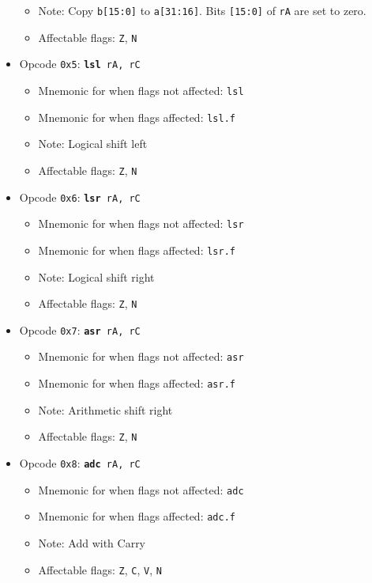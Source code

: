 \documentclass{article}
\begin{document}
\begin{itemize}
\begin{itemize}
			\item Note:  Copy \texttt{b[15:0]} to \texttt{a[31:16]}.
			Bits \texttt{[15:0]} of \texttt{rA} are set to zero.
			\item Affectable flags:
				\texttt{Z}, \texttt{N}
		\end{itemize}
		\item Opcode \texttt{0x5}:
			\texttt{\textbf{lsl} rA, rC}
		\begin{itemize}
			\item Mnemonic for when flags not affected:  \texttt{lsl}
			\item Mnemonic for when flags affected:  \texttt{lsl.f}
			\item Note:  Logical shift left
			\item Affectable flags:
				\texttt{Z}, \texttt{N}
		\end{itemize}
		\item Opcode \texttt{0x6}:
			\texttt{\textbf{lsr} rA, rC}
		\begin{itemize}
			\item Mnemonic for when flags not affected:  \texttt{lsr}
			\item Mnemonic for when flags affected:  \texttt{lsr.f}
			\item Note:  Logical shift right
			\item Affectable flags:
				\texttt{Z}, \texttt{N}
		\end{itemize}
		\item Opcode \texttt{0x7}:
			\texttt{\textbf{asr} rA, rC}
		\begin{itemize}
			\item Mnemonic for when flags not affected:  \texttt{asr}
			\item Mnemonic for when flags affected:  \texttt{asr.f}
			\item Note:  Arithmetic shift right
			\item Affectable flags:
				\texttt{Z}, \texttt{N}
		\end{itemize}
		\item Opcode \texttt{0x8}:
			\texttt{\textbf{adc} rA, rC}
		\begin{itemize}
			\item Mnemonic for when flags not affected:  \texttt{adc}
			\item Mnemonic for when flags affected:  \texttt{adc.f}
			\item Note:  Add with Carry
			\item Affectable flags:
				\texttt{Z}, \texttt{C}, \texttt{V}, \texttt{N}

\end{itemize}
\end{itemize}
\end{document}

